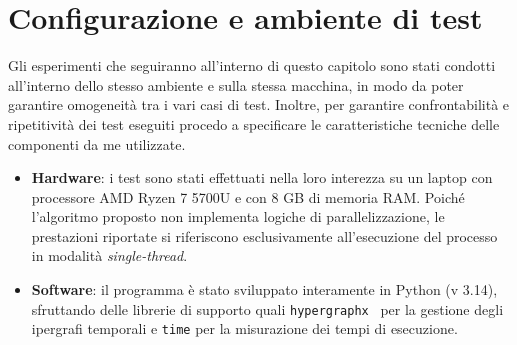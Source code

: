 
\section{Configurazione e ambiente di test}\label{sec:configurazione_e_ambiente_di_test}

Gli esperimenti che seguiranno all'interno di questo capitolo sono stati condotti all'interno dello stesso ambiente e sulla stessa macchina, in modo da poter garantire omogeneità tra i vari casi di test.
Inoltre, per garantire confrontabilità e ripetitività dei test eseguiti procedo a specificare le caratteristiche tecniche delle componenti da me utilizzate.
\begin{itemize}
    \item \textbf{Hardware}: i test sono stati effettuati nella loro interezza su un laptop con processore AMD Ryzen 7 5700U e con 8 GB di memoria RAM.
    Poiché l'algoritmo proposto non implementa logiche di parallelizzazione, le prestazioni riportate si riferiscono esclusivamente all'esecuzione del processo in modalità \textit{single-thread}.
    \item \textbf{Software}: il programma è stato sviluppato interamente in Python (v 3.14), sfruttando delle librerie di supporto quali \texttt{hypergraphx}~\cite{lotito2023} per la gestione degli ipergrafi temporali e \texttt{time} per la misurazione dei tempi di esecuzione.
\end{itemize}